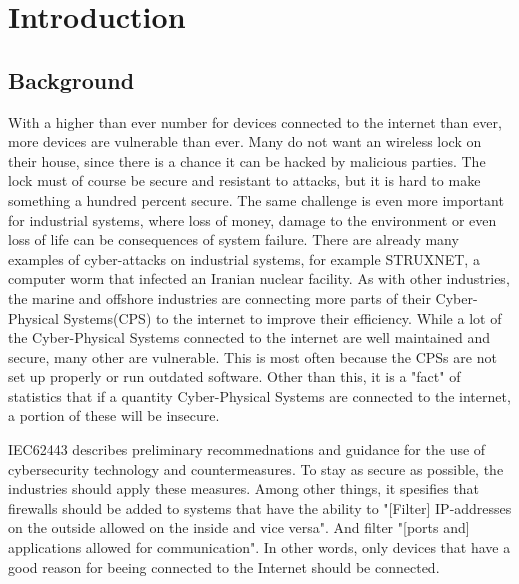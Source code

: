 \section{Introduction} \label{sec:intro}

\subsection{Background} \label{sec:background}
With a higher than ever number for devices connected to the internet than ever\cite{iot_stats}, more devices are vulnerable than ever. Many do not want an wireless lock on their house, since there is a chance it can be hacked by malicious parties. The lock must of course be secure and resistant to attacks, but it is hard to make something a hundred percent secure. The same challenge is even more important for industrial systems, where loss of money, damage to the environment or even loss of life can be consequences of system failure. There are already many examples of cyber-attacks on industrial systems, for example STRUXNET\cite{struxnet}, a computer worm that infected an Iranian nuclear facility. 
As with other industries, the marine and offshore industries are connecting more parts of their Cyber-Physical Systems(CPS) to the internet to improve their efficiency. While a lot of the Cyber-Physical Systems connected to the internet are well maintained and secure, many other are vulnerable. This is most often because the CPSs are not set up properly or run outdated software. Other than this, it is a "fact" of statistics that if a quantity Cyber-Physical Systems are connected to the internet, a portion of these will be insecure. 

IEC62443 describes preliminary recommednations and guidance for the use of cybersecurity technology and countermeasures. To stay as secure as possible, the industries should apply these measures.\cite{IEC62443} Among other things, it spesifies that firewalls should be added to systems that have the ability to "[Filter] IP-addresses on the outside allowed on the inside and vice versa". And filter "[ports and] applications allowed for communication". In other words, only devices that have a good reason for beeing connected to the Internet should be connected. 

